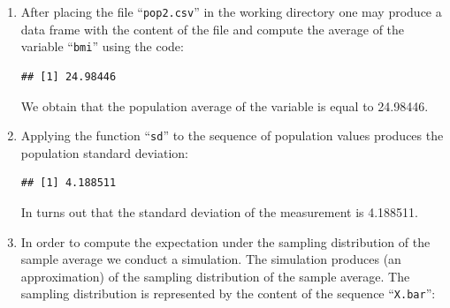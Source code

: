 \documentclass[
]{krantz}
\makeatletter
\newenvironment{Shaded}{\begin{snugshade}}{\end{snugshade}}
\newcommand{\ControlFlowTok}[1]{\textcolor[rgb]{0.13,0.29,0.53}{\textbf{#1}}}
\newcommand{\DataTypeTok}[1]{\textcolor[rgb]{0.13,0.29,0.53}{#1}}
\newcommand{\DecValTok}[1]{\textcolor[rgb]{0.00,0.00,0.81}{#1}}
\newcommand{\FloatTok}[1]{\textcolor[rgb]{0.00,0.00,0.81}{#1}}
\newcommand{\KeywordTok}[1]{\textcolor[rgb]{0.13,0.29,0.53}{\textbf{#1}}}
\newcommand{\NormalTok}[1]{#1}
\newcommand{\OperatorTok}[1]{\textcolor[rgb]{0.81,0.36,0.00}{\textbf{#1}}}
\newcommand{\StringTok}[1]{\textcolor[rgb]{0.31,0.60,0.02}{#1}}
\newenvironment{kframe}{%
\medskip{}
\setlength{\fboxsep}{.8em}
 \def\at@end@of@kframe{}%
 \ifinner\ifhmode%
  \def\at@end@of@kframe{\end{minipage}}%
  \begin{minipage}{\columnwidth}%
 \fi\fi%
 \def\FrameCommand##1{\hskip\@totalleftmargin \hskip-\fboxsep
 \colorbox{shadecolor}{##1}\hskip-\fboxsep
     \hskip-\linewidth \hskip-\@totalleftmargin \hskip\columnwidth}%
 \MakeFramed {\advance\hsize-\width
   \@totalleftmargin\z@ \linewidth\hsize
   \@setminipage}}%
 {\par\unskip\endMakeFramed%
 \at@end@of@kframe}
\renewenvironment{Shaded}{\begin{kframe}}{\end{kframe}}
\theoremstyle{definition}
\theoremstyle{definition}
\theoremstyle{definition}
\theoremstyle{remark}
\makeatother
\begin{document}
\begin{enumerate}
\def\labelenumi{\arabic{enumi}.}
\item
  After placing the file ``\texttt{pop2.csv}'' in the working directory one may produce
  a data frame with the content of the file and compute the average of the
  variable ``\texttt{bmi}'' using the code:

\begin{Shaded}
\end{Shaded}

\begin{verbatim}
## [1] 24.98446
\end{verbatim}

  We obtain that the population average of the variable is equal to 24.98446.
\item
  Applying the function ``\texttt{sd}'' to the
  sequence of population values produces the population standard
  deviation:

\begin{Shaded}
\end{Shaded}

\begin{verbatim}
## [1] 4.188511
\end{verbatim}

  In turns out that the standard deviation of the measurement is 4.188511.
\item
  In order to compute the expectation
  under the sampling distribution of the sample average we conduct a
  simulation. The simulation produces (an approximation) of the sampling
  distribution of the sample average. The sampling distribution is
  represented by the content of the sequence ``\texttt{X.bar}'':

\begin{Shaded}
\end{Shaded}


\end{enumerate}
\end{document}
